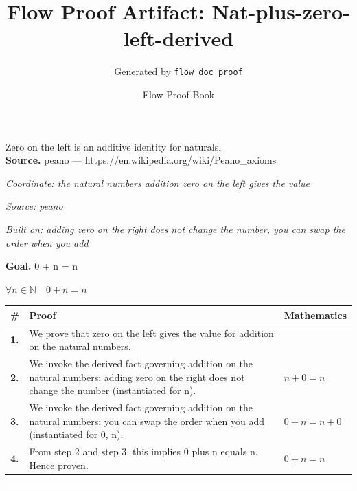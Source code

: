 \documentclass[11pt]{article}
\title{Flow Proof Artifact: Nat-plus-zero-left-derived}
\author{Generated by \texttt{flow doc proof}}
\date{Flow Proof Book}
\theoremstyle{definition}
\begin{document}
\maketitle
Zero on the left is an additive identity for naturals.\\[0.5em]
\textbf{Source.} peano — https://en.wikipedia.org/wiki/Peano\_axioms\\[0.5em]
\bigskip
{}\par
\smallskip\noindent\textit{Coordinate: the natural numbers \cdot addition \cdot zero on the left gives the value}\par
\smallskip\noindent\textit{Source: peano}\par
\smallskip\noindent\textit{Built on: adding zero on the right does not change the number, you can swap the order when you add}\par
\medskip
\noindent\textbf{Goal.} 0 + n = n\par
\noindent$\displaystyle \forall n \in \mathbb{N}\quad 0 + n = n$\par
\medskip
\noindent
\begin{tabular}{@{} >{\raggedright\arraybackslash}p{} >{\raggedright\arraybackslash}p{} >{\raggedleft\arraybackslash}p{} @{}}
\textbf{\#} & \textbf{Proof} & \textbf{Mathematics} \\
\midrule
\textbf{1.} & We prove that zero on the left gives the value for addition on the natural numbers. & \\[0.45em]
\textbf{2.} & We invoke the derived fact governing addition on the natural numbers: adding zero on the right does not change the number (instantiated for n). & $\displaystyle n + 0 = n$ \\[0.45em]
\textbf{3.} & We invoke the derived fact governing addition on the natural numbers: you can swap the order when you add (instantiated for 0, n). & $\displaystyle 0 + n = n + 0$ \\[0.45em]
\textbf{4.} & From step 2 and step 3, this implies 0 plus n equals n. Hence proven. & $\displaystyle 0 + n = n$ \\[0.45em]
\bottomrule
\end{tabular}
\label{thm:Nat-addition-zero_on_the_left_gives_the_value}
\par\medskip\hrule
\end{document}
